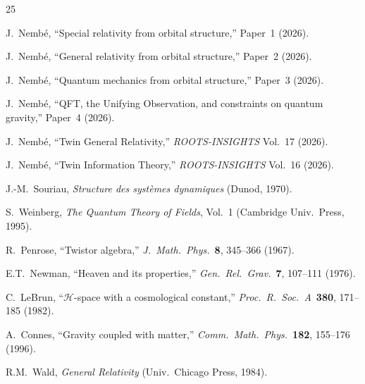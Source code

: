 \documentclass[12pt]{article}
\theoremstyle{plain}
\theoremstyle{definition}
\theoremstyle{remark}
\begin{document}
\begin{thebibliography}{25}

 J.~Nemb\'e, ``Special relativity from orbital structure,'' Paper~1 (2026).

 J.~Nemb\'e, ``General relativity from orbital structure,'' Paper~2 (2026).

 J.~Nemb\'e, ``Quantum mechanics from orbital structure,'' Paper~3 (2026).

 J.~Nemb\'e, ``QFT, the Unifying Observation, and constraints on quantum gravity,'' Paper~4 (2026).

 J.~Nemb\'e, ``Twin General Relativity,'' \emph{ROOTS-INSIGHTS} Vol.~17 (2026).

 J.~Nemb\'e, ``Twin Information Theory,'' \emph{ROOTS-INSIGHTS} Vol.~16 (2026).

 J.-M.~Souriau, \emph{Structure des syst\`emes dynamiques} (Dunod, 1970).

 S.~Weinberg, \emph{The Quantum Theory of Fields}, Vol.~1 (Cambridge Univ.\ Press, 1995).

 R.~Penrose, ``Twistor algebra,'' \emph{J.\ Math.\ Phys.}\ \textbf{8}, 345--366 (1967).

 E.T.~Newman, ``Heaven and its properties,'' \emph{Gen.\ Rel.\ Grav.}\ \textbf{7}, 107--111 (1976).

 C.~LeBrun, ``$\mathcal{H}$-space with a cosmological constant,'' \emph{Proc.\ R.\ Soc.\ A}\ \textbf{380}, 171--185 (1982).

 A.~Connes, ``Gravity coupled with matter,'' \emph{Comm.\ Math.\ Phys.}\ \textbf{182}, 155--176 (1996).

 R.M.~Wald, \emph{General Relativity} (Univ.\ Chicago Press, 1984).

\end{thebibliography}
\end{document}
